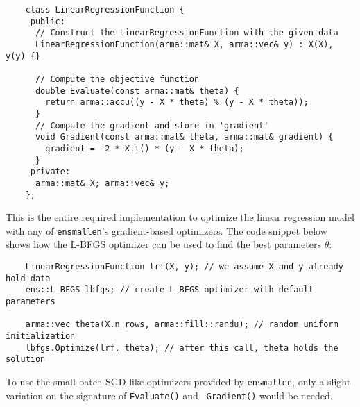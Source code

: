 \documentclass{article}
\begin{document}
\vspace*{-0.4em}
\begin{verbatim}
    class LinearRegressionFunction {
     public:
      // Construct the LinearRegressionFunction with the given data
      LinearRegressionFunction(arma::mat& X, arma::vec& y) : X(X), y(y) {}

      // Compute the objective function
      double Evaluate(const arma::mat& theta) {
        return arma::accu((y - X * theta) % (y - X * theta));
      }
      // Compute the gradient and store in 'gradient'
      void Gradient(const arma::mat& theta, arma::mat& gradient) {
        gradient = -2 * X.t() * (y - X * theta);
      }
     private:
      arma::mat& X; arma::vec& y;
    };
\end{verbatim}
\vspace*{-0.4em}

This is the entire required implementation to optimize the linear regression model with
any of {\tt ensmallen}'s gradient-based optimizers.  The code snippet below
shows how the L-BFGS optimizer can be used to find the best parameters $\theta$:

\vspace*{-0.4em}
\begin{verbatim}
    LinearRegressionFunction lrf(X, y); // we assume X and y already hold data
    ens::L_BFGS lbfgs; // create L-BFGS optimizer with default parameters

    arma::vec theta(X.n_rows, arma::fill::randu); // random uniform initialization
    lbfgs.Optimize(lrf, theta); // after this call, theta holds the solution
\end{verbatim}
\vspace*{-0.4em}

To use the small-batch SGD-like optimizers provided by {\tt ensmallen},
only a slight variation on the signature of {\tt Evaluate()} and {\tt
Gradient()} would be needed.

\vspace*{-0.3em}
\end{document}
